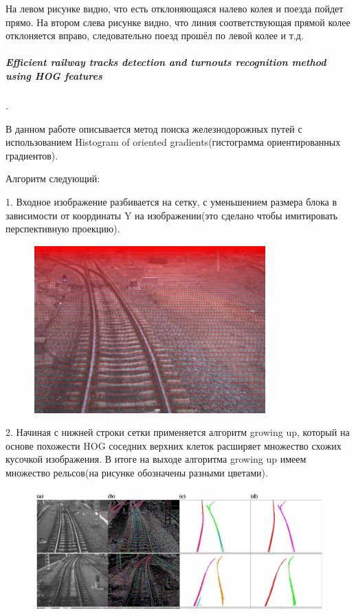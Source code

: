На левом рисунке видно, что есть отклоняющаяся налево колея и поезда пойдет прямо.
На втором слева рисунке видно, что линия соответствующая прямой колее отклоняется вправо, следовательно поезд прошёл по левой колее и т.д.

\subparagraph{Efficient railway tracks detection and turnouts recognition method using HOG features \cite{b:growing_up}}.

В данном работе описывается метод поиска железнодорожных путей с использованием Histogram of oriented gradients\cite{b:HOG}(гистограмма ориентированных градиентов).

\newpage
Алгоритм следующий:

1. Входное изображение разбивается на сетку, с уменьшением размера блока в зависимости от координаты Y на изображении(это сделано чтобы имитировать перспективную проекцию).
\begin{figure}[!h]
	\centering
	\includegraphics[width=1\linewidth]{pictures/screenshot009}
	\caption{}
	\label{fig:screenshot009}
\end{figure}

2. Начиная с нижней строки сетки применяется алгоритм growing up, который на основе похожести HOG соседних верхних клеток расширяет множество схожих кусочкой изображения.
В итоге на выходе алгоритма growing up имеем множество рельсов(на рисунке обозначены разными цветами).
\begin{figure}[!h]
	\centering
	\includegraphics[width=1\linewidth]{pictures/screenshot010}
	\caption{}
	\label{fig:screenshot010}
\end{figure}

